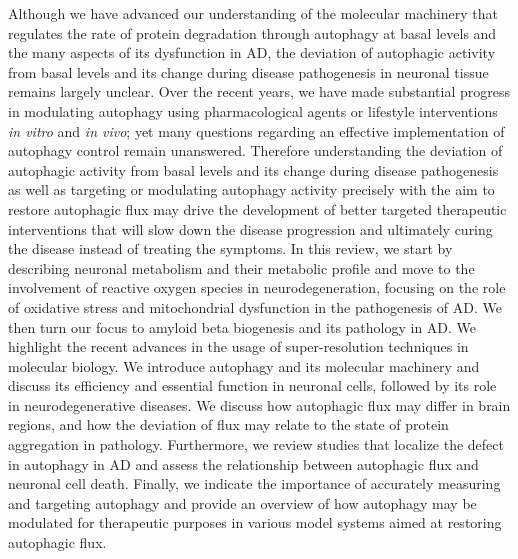 Although we have advanced our understanding of the molecular machinery that regulates the rate of protein degradation through autophagy at basal levels and the many aspects of its dysfunction in AD, the deviation of autophagic activity from basal levels and its change during disease pathogenesis in neuronal tissue remains largely unclear. Over the recent years, we have made substantial progress in modulating autophagy using pharmacological agents \citep{Berger2006,Hebron2013,Ravikumar2002,Ravikumar2004,Rose2010} or lifestyle interventions \citep{Alirezaei2010,Kuma2004,Mizushima2004a,Scott2004} \textit{in vitro} and \textit{in vivo}; yet many questions regarding an effective implementation of autophagy control remain unanswered. Therefore understanding the deviation of autophagic activity from basal levels and its change during disease pathogenesis as well as targeting or modulating autophagy activity precisely with the aim to restore autophagic flux may drive the development of better targeted therapeutic interventions that will slow down the disease progression and ultimately curing the disease instead of treating the symptoms. In this review, we start by describing neuronal metabolism and their metabolic profile and move to the involvement of reactive oxygen species in neurodegeneration, focusing on the role of oxidative stress and mitochondrial dysfunction in the pathogenesis of AD. We then turn our focus to amyloid beta biogenesis and its pathology in AD.  We highlight the recent advances in the usage of super-resolution techniques in molecular biology. We introduce autophagy and its molecular machinery and discuss its efficiency and essential function in neuronal cells, followed by its role in neurodegenerative diseases. We discuss how autophagic flux may differ in brain regions, and how the deviation of flux may relate to the state of protein aggregation in pathology. Furthermore, we review studies that localize the defect in autophagy in AD and assess the relationship between autophagic flux and neuronal cell death. Finally, we indicate the importance of accurately measuring and targeting autophagy and provide an overview of how autophagy may be modulated for therapeutic purposes in various model systems aimed at restoring autophagic flux. 

